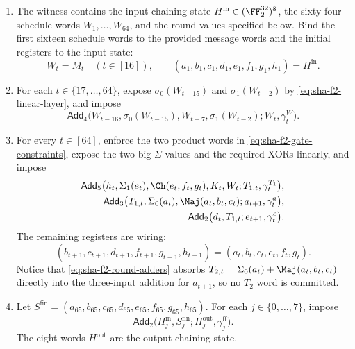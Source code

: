 \begin{enumerate}[label=\textbf{F\arabic*.},leftmargin=2.8em]
\item\label{item:sha-f2-input}
  The witness contains the input chaining state
  $H^{\mathrm{in}}\in(\FF_2^{32})^8$, the sixty-four schedule words
  $W_1,\ldots,W_{64}$, and the round values specified below.  Bind the first
  sixteen schedule words to the provided message words and the initial
  registers to the input state:
  \begin{equation}\label{eq:sha-f2-boundary}
  W_t=M_t\quad(t\in[16]),
  \qquad
  (a_1,b_1,c_1,d_1,e_1,f_1,g_1,h_1)=H^{\mathrm{in}}.
  \end{equation}

\item\label{item:sha-f2-schedule}
  For each $t\in\{17,\ldots,64\}$, expose
  $\sigma_0(W_{t-15})$ and $\sigma_1(W_{t-2})$ by
  \eqref{eq:sha-f2-linear-layer}, and impose
  \begin{equation}\label{eq:sha-f2-schedule}
  \mathsf{Add}_4\bigl(
       W_{t-16},\sigma_0(W_{t-15}),W_{t-7},\sigma_1(W_{t-2});
       W_t,\gamma^W_t
  \bigr).
  \end{equation}

\item\label{item:sha-f2-rounds}
  For every $t\in[64]$, enforce the two product words in
  \eqref{eq:sha-f2-gate-constraints}, expose the two big-$\Sigma$ values and
  the required XORs linearly, and impose
  \begin{equation}\label{eq:sha-f2-round-adders}
  \begin{aligned}
  \mathsf{Add}_5\bigl(
    h_t,\Sigma_1(e_t),\Ch(e_t,f_t,g_t),K_t,W_t;
    T_{1,t},\gamma^{T_1}_t\bigr),\\
  \mathsf{Add}_3\bigl(
    T_{1,t},\Sigma_0(a_t),\Maj(a_t,b_t,c_t);
    a_{t+1},\gamma^a_t\bigr),\\
  \mathsf{Add}_2\bigl(
    d_t,T_{1,t};e_{t+1},\gamma^e_t\bigr).
  \end{aligned}
  \end{equation}
  The remaining registers are wiring:
  \begin{equation}\label{eq:sha-f2-register-shift}
  (b_{t+1},c_{t+1},d_{t+1},f_{t+1},g_{t+1},h_{t+1})
  =(a_t,b_t,c_t,e_t,f_t,g_t).
  \end{equation}
  Notice that \eqref{eq:sha-f2-round-adders} absorbs
  $T_{2,t}=\Sigma_0(a_t)+\Maj(a_t,b_t,c_t)$ directly into the
  three-input addition for $a_{t+1}$, so no $T_2$ word is committed.

\item\label{item:sha-f2-feed-forward}
  Let
  $S^{\mathrm{fin}}=(a_{65},b_{65},c_{65},d_{65},
  e_{65},f_{65},g_{65},h_{65})$.  For each $j\in\{0,\ldots,7\}$, impose
  \begin{equation}\label{eq:sha-f2-feed-forward}
    \mathsf{Add}_2\bigl(
      H^{\mathrm{in}}_j,S^{\mathrm{fin}}_j;
      H^{\mathrm{out}}_j,\gamma^{\mathrm{ff}}_j
    \bigr).
  \end{equation}
  The eight words $H^{\mathrm{out}}$ are the output chaining state.
\end{enumerate}

